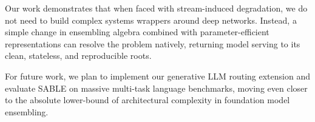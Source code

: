 Our work demonstrates that when faced with stream-induced degradation, we do not need to build complex systems wrappers around deep networks. Instead, a simple change in ensembling algebra combined with parameter-efficient representations can resolve the problem natively, returning model serving to its clean, stateless, and reproducible roots.

For future work, we plan to implement our generative LLM routing extension and evaluate SABLE on massive multi-task language benchmarks, moving even closer to the absolute lower-bound of architectural complexity in foundation model ensembling.
